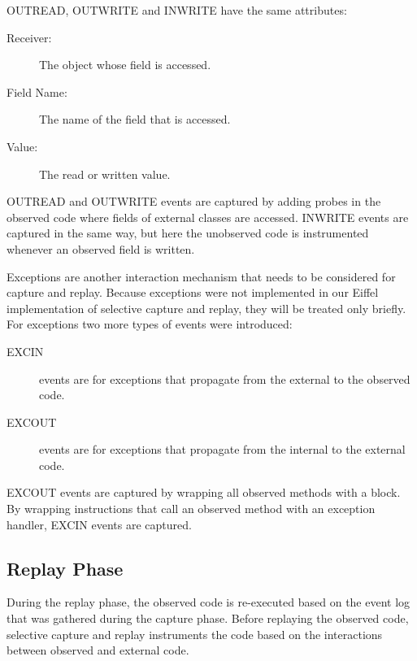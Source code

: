 OUTREAD, OUTWRITE and INWRITE have the same attributes:

\begin{description}
 \item [Receiver:] The object whose field is accessed.
 \item [Field Name:] The name of the field that is accessed.
 \item [Value:] The read or written value.
\end{description}

OUTREAD and OUTWRITE events are captured by adding probes in the observed code where fields of external classes are accessed. INWRITE events are captured in the same way, but here the unobserved code is instrumented whenever an observed field is written. 

Exceptions are another interaction mechanism that needs to be considered for capture and replay. Because exceptions were not implemented in our Eiffel implementation of selective capture and replay, they will be treated only briefly. For exceptions two more types of events were introduced:
\begin{description}
 \item [EXCIN] events are for exceptions that propagate from the external to the observed code.
 \item [EXCOUT] events are for exceptions that propagate from the internal to the external code.
\end{description}
EXCOUT events are captured by wrapping all observed methods with a  block. By wrapping instructions that call an observed method with an exception handler,  EXCIN events are captured.

\subsection{Replay Phase}
During the replay phase, the observed code is re-executed based on the event log that was gathered during the capture phase. Before replaying the observed code, selective capture and replay instruments the code based on the interactions between observed and external code. 

